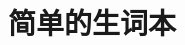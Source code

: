\documentclass{ctexart}
\title{简单的生词本}
\begin{document}
\maketitle



%
%
%

\parindent=0pt

\begin{MyNewWords}[sort=true]
\end{MyNewWords}
\end{document}
